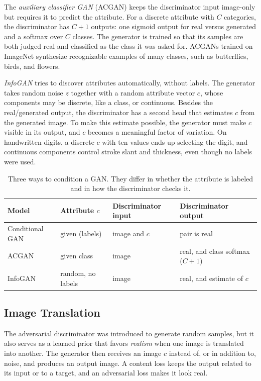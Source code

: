 The \emph{auxiliary classifier GAN} (ACGAN) keeps the discriminator input
image-only but requires it to predict the attribute. For a discrete attribute
with $C$ categories, the discriminator has $C+1$ outputs: one sigmoid output
for real versus generated and a softmax over $C$ classes. The generator is
trained so that its samples are both judged real and classified as the class it
was asked for. ACGANs trained on ImageNet synthesize recognizable examples of
many classes, such as butterflies, birds, and flowers.

\emph{InfoGAN} tries to discover attributes automatically, without labels. The
generator takes random noise $z$ together with a random attribute vector $c$,
whose components may be discrete, like a class, or continuous. Besides the
real/generated output, the discriminator has a second head that estimates $c$
from the generated image. To make this estimate possible, the generator must
make $c$ visible in its output, and $c$ becomes a meaningful factor of
variation. On handwritten digits, a discrete $c$ with ten values ends up
selecting the digit, and continuous components control stroke slant and
thickness, even though no labels were used.

\begin{table}[ht]
  \centering
  \begin{tabular}{@{}p{2.6cm}p{3.2cm}p{4.0cm}p{4.2cm}@{}}
    \toprule
    Model & Attribute $c$ & Discriminator input & Discriminator output \\
    \midrule
    Conditional GAN & given (labels) & image and $c$ & pair is real \\
    ACGAN & given class & image & real, and class softmax ($C+1$) \\
    InfoGAN & random, no labels & image & real, and estimate of $c$ \\
    \bottomrule
  \end{tabular}
  \caption{Three ways to condition a GAN. They differ in whether the attribute
  is labeled and in how the discriminator checks it.}
  \label{tab:gan-conditional}
\end{table}

\subsection{Image Translation}

The adversarial discriminator was introduced to generate random samples, but it
also serves as a learned prior that favors \emph{realism} when one image is
translated into another. The generator then receives an image $c$ instead of,
or in addition to, noise, and produces an output image. A content loss keeps
the output related to its input or to a target, and an adversarial loss makes it
look real.

